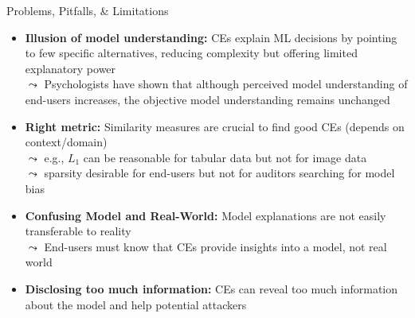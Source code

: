 \documentclass[10pt,compress,t,notes=noshow, xcolor=table]{beamer}
\begin{document}
\begin{frame}{Problems, Pitfalls, \& Limitations}
\begin{itemize}[<+->]
    \item \textbf{Illusion of model understanding:} 
    CEs explain ML decisions by pointing to few specific alternatives, reducing complexity but offering limited explanatory power\\
    $\leadsto$ %
    Psychologists have shown that although perceived model understanding of end-users increases, the objective model understanding remains unchanged
    
    \item \textbf{Right metric:} Similarity measures are crucial to find good CEs (depends on context/domain)\\
    $\leadsto$ e.g., $L_1$ can be reasonable for tabular data but not for image data\\
    $\leadsto$ sparsity desirable for end-users but not for auditors searching for model bias

    \item \textbf{Confusing Model and Real-World:} Model explanations are not easily transferable to reality\\
    $\leadsto$ End-users must know that CEs provide insights into a model, not real world %
    \item \textbf{Disclosing too much information:} 
    CEs can reveal too much information about the model and help potential attackers
    \end{itemize}
\end{frame}
\end{document}
